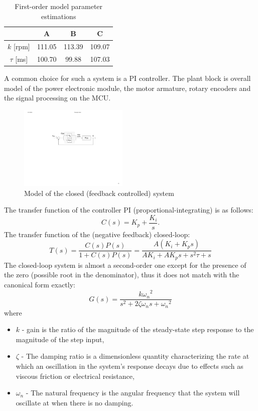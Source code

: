 \documentclass[12pt,english]{article}
\begin{document}
\begin{table}[h]
	\centering
	\label{first_order_model_table}
	\begin{tabular}{cccc}
		\hline
		& A  		& B  		& C   		\\ \hline
		$k$ {[}rpm{]} 		& 111.05 	& 113.39 	& 109.07 	\\
		$\tau$ {[}ms{]}       & 100.70 	& 99.88 	& 107.03   	\\ \hline
	\end{tabular}
	\caption{First-order model parameter estimations}
\end{table}
A common choice for such a system is a PI controller.\cite{dc_motor_3} The plant block is overall model of the power electronic module, the motor armature, rotary encoders and the signal processing on the MCU. 
\begin{figure}[htb!]
	\centering
	\includegraphics[height=4cm]{figures/control_block_diagram}
	\caption{Model of the closed (feedback controlled) system}
	\label{dc_motor_closed_system}
\end{figure}
The transfer function of the controller PI (proportional-integrating) is as follows:
\begin{equation}
C(s) = K_p + \frac{K_i}{s}.
\end{equation}
The transfer function of the (negative feedback) closed-loop:
\begin{equation}
T(s) = \frac{C(s)P(s)}{1+C(s)P(s)}=\frac{A (K_i+K_p s)}{A K_i+A K_p s+s^2 \tau +s}
\label{eq_transfer_function}
\end{equation}
The closed-loop system is almost a second-order one except for the presence of the zero (possible root in the denominator), thus it does not match with the canonical form exactly:
\begin{equation}
G(s) = \frac{{k \omega_n}^2}{s^2 + 2 \zeta \omega_n s +{\omega_n}^2}
\label{eq_transfer_function_canonical}
\end{equation}
where
\begin{itemize}
	\item $k$ - gain is the ratio of the magnitude of the steady-state step response to the magnitude of the step input,
	\item $\zeta$ - The damping ratio is a dimensionless quantity characterizing the rate at which an oscillation in the system's response 		decays due to effects such as viscous friction or electrical resistance,
	\item $\omega_n$ - The natural frequency is the angular frequency that the system will oscillate at when there is no damping. \cite{dc_motor_3}
\end{itemize}
\end{document}
